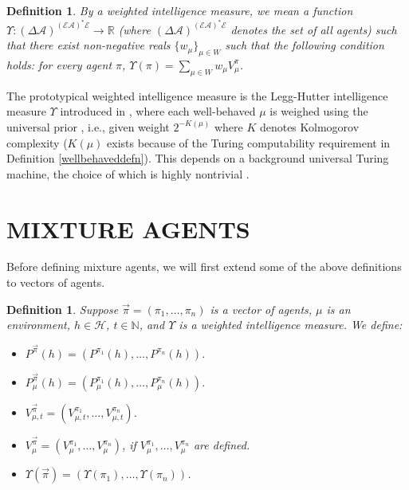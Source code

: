 \documentclass[twoside]{article}
\newtheorem{definition}[theorem]{Definition}
\begin{document}
\begin{definition}
\label{performanceaveragerdefn}
    By a \emph{weighted intelligence measure}, we mean a function
    $
        \Upsilon:
        (\Delta\mathcal A)^{(\mathcal E\mathcal A)^*\mathcal E}
        \to
        \mathbb R
    $
    (where
    $(\Delta\mathcal A)^{(\mathcal E\mathcal A)^*\mathcal E}$ denotes the set of all agents)
    such that there exist non-negative reals $\{w_\mu\}_{\mu\in W}$ such that the following
    condition holds:
    for every agent $\pi$, $\Upsilon(\pi)=\sum_{\mu\in W}w_\mu V^\pi_\mu$.
\end{definition}

The prototypical weighted intelligence measure is the Legg-Hutter intelligence
measure $\Upsilon$ introduced in \cite{legg2007universal},
where each well-behaved $\mu$ is
weighed using the universal prior \cite{li2008introduction,DBLP:conf/alt/Hutter03}, i.e.,
given weight $2^{-K(\mu)}$
where $K$ denotes Kolmogorov complexity ($K(\mu)$ exists because of the Turing
computability requirement in Definition \ref{wellbehaveddefn}).
This depends on a background universal
Turing machine, the choice of which is highly nontrivial
\cite{leike2015bad}.

\section{MIXTURE AGENTS}

Before defining mixture agents, we will first extend some of the above
definitions to vectors of agents.

\begin{definition}
\label{vectorizationdefn}
    Suppose $\vec\pi=(\pi_1,\ldots,\pi_n)$ is a vector of agents, $\mu$ is an environment,
    $h\in\mathcal H$, $t\in\mathbb N$, and $\Upsilon$ is a weighted
    intelligence measure. We define:
    \begin{itemize}
        \item ${P^{\vec\pi}}(h)=(P^{\pi_1}(h),\ldots,P^{\pi_n}(h))$.
        \item $P^{\vec\pi}_\mu(h)=(P^{\pi_1}_\mu(h),\ldots,P^{\pi_n}_\mu(h))$.
        \item $V^{\vec\pi}_{\mu,t}=(V^{\pi_1}_{\mu,t},\ldots,V^{\pi_n}_{\mu,t})$.
        \item $V^{\vec\pi}_\mu=(V^{\pi_1}_\mu,\ldots,V^{\pi_n}_\mu)$,
            if $V^{\pi_1}_\mu,\ldots,V^{\pi_n}_\mu$ are defined.
        \item $\Upsilon(\vec\pi)=(\Upsilon(\pi_1),\ldots,\Upsilon(\pi_n))$.
    \end{itemize}
\end{definition}
\end{document}
